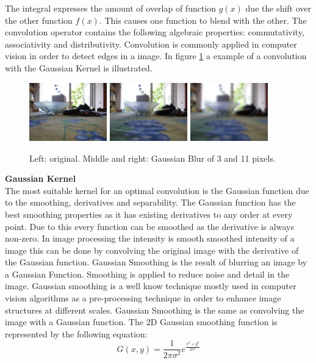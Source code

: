 \documentclass[a4paper]{article}
\begin{document}
\begin{appendices}
The integral expresses the amount of overlap of function $g(x)$
due the shift over the other function $f(x)$. This causes one function to blend with the other. The convolution operator contains the following algebraic properties: commutativity, associativity and distributivity. Convolution is commonly applied in computer vision in order to detect edges in a image. In figure \ref{gaussianblur} a example of a convolution with the Gaussian Kernel is illustrated.
\begin{figure}[!ht]
\centering
\includegraphics[width=0.3\textwidth]{images/frame1.jpg}
\includegraphics[width=0.3\textwidth]{images/gaussian_blur_3.png}
\includegraphics[width=0.3\textwidth]{images/gaussian_blur_11.png}
\caption[Gaussian Blur]{Left: original. Middle and right: Gaussian Blur of 3 and 11 pixels.}
\label{gaussianblur}
\end{figure}

\noindent\textbf{Gaussian Kernel}\\
The most suitable kernel for an optimal convolution is the Gaussian function due to the smoothing, derivatives and separability. The Gaussian function has the best smoothing properties as it has existing derivatives to any order at every point. Due to this every function can be smoothed as the derivative is always non-zero. In image processing the intensity is smooth smoothed intensity of a image this can be done by convolving the original image with the derivative of the Gaussian function. Gaussian Smoothing is the result of blurring an image by a Gaussian Function. Smoothing is applied to reduce noise and detail in the image. Gaussian smoothing is a well know technique mostly used in computer vision algorithms as a pre-processing technique in order to enhance image structures at different scales. Gaussian Smoothing is the same as convolving the image with a Gaussian function. The 2D Gaussian smoothing function is represented by the following equation:
\begin{equation*}
G(x,y) = \frac{1}{2\pi\sigma^2}e^{\frac{x^2 + y^2}{2\sigma^2}}
\end{equation*}


\end{appendices}
\end{document}
